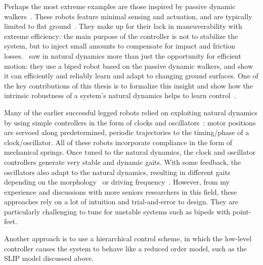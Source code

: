 
Perhaps the most extreme examples are those inspired by passive dynamic walkers~\cite{mcgeer1990passive}. These robots feature minimal sensing and actuation, and are typically limited to flat ground~\cite{bhounsule2012design,wisse2006design}. They make up for their lack in maneuverability with extreme efficiency: the main purpose of the controller is not to stabilize the system, but to inject small amounts to compensate for impact and friction losses.~\textcite{tedrake2005learning} saw in natural dynamics more than just the opportunity for efficient motion: they use a biped robot based on the passive dynamic walkers, and show it can efficiently and reliably learn and adapt to changing ground surfaces. One of the key contributions of this thesis is to formalize this insight and show how the intrinsic robustness of a system's natural dynamics helps to learn control~\cite{heim2019beyond}. \par
Many of the earlier successful legged robots relied on exploiting natural dynamics by using simple controllers in the form of clocks and oscillators~\cite{sprowitz2013towards,buchli2006resonance,altendorfer2001rhex,owaki2013simple}: motor positions are servoed along predetermined, periodic trajectories to the timing/phase of a clock/oscillator. All of these robots incorporate compliance in the form of mechanical springs. Once tuned to the natural dynamics, the clock and oscillator controllers generate very stable and dynamic gaits. With some feedback, the oscillators also adapt to the natural dynamics, resulting in different gaits depending on the morphology~\cite{owaki2013simple} or driving frequency~\cite{owaki2013simple,owaki2017quadruped}. %
However, from my experience and discussions with more seniors researchers in this field, these approaches rely on a lot of intuition and trial-and-error to design. They are particularly challenging to tune for unstable systems such as bipeds with point-feet. \par
Another approach is to use a hierarchical control scheme, in which the low-level controller causes the system to behave like a reduced order model, such as the SLIP model discussed above.
